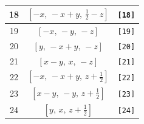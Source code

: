 \documentclass[fleqn,8pt]{jsarticle}
\begin{document}
\begin{longtable}{ccc}
18 & $\left[ - x,\, - x + y,\, \frac{1}{2} - z \right]$ & {\tt [18]} \\ \hline
19 & $\left[ - x,\, - y,\, - z \right]$ & {\tt [19]} \\ \hline
20 & $\left[ y,\, - x + y,\, - z \right]$ & {\tt [20]} \\ \hline
21 & $\left[ x - y,\, x,\, - z \right]$ & {\tt [21]} \\ \hline
22 & $\left[ - x,\, - x + y,\, z + \frac{1}{2} \right]$ & {\tt [22]} \\ \hline
23 & $\left[ x - y,\, - y,\, z + \frac{1}{2} \right]$ & {\tt [23]} \\ \hline
24 & $\left[ y,\, x,\, z + \frac{1}{2} \right]$ & {\tt [24]} \\
\end{longtable}
\end{document}
